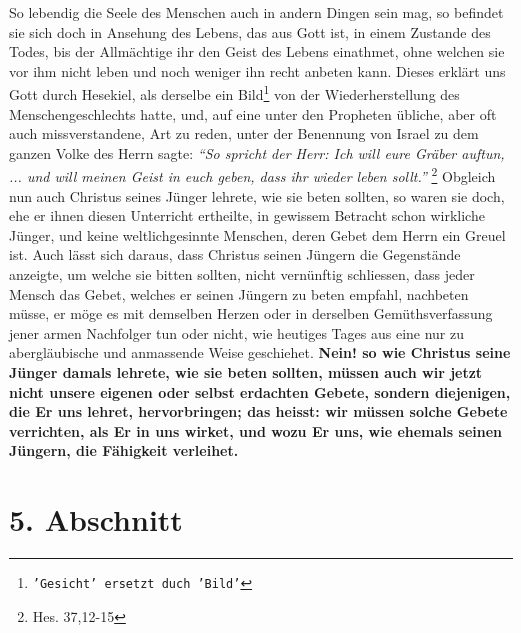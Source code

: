  So lebendig die Seele des Menschen auch in andern
Dingen sein mag, so befindet
sie sich doch in Ansehung des Lebens, das aus Gott ist, in einem Zustande des
Todes, bis der Allmächtige ihr den Geist des Lebens einathmet, ohne welchen sie
vor ihm nicht leben und noch weniger ihn recht anbeten kann. Dieses erklärt uns
Gott durch Hesekiel, als derselbe ein Bild\footnote{\texttt{'Gesicht' ersetzt duch
'Bild'}} von der Wiederherstellung des
Menschengeschlechts hatte, und,
auf eine unter den Propheten  übliche, aber oft auch
missverstandene, Art zu
reden, unter der Benennung von Israel  zu dem
ganzen Volke des Herrn sagte:
\textit{"`So spricht der Herr: Ich will eure Gräber auftun, ... und will meinen
Geist in
euch geben, dass ihr wieder leben sollt."'}
\footnote{Hes. 37,12-15}
Obgleich nun auch Christus seines
Jünger lehrete, wie sie beten sollten, so waren sie doch, ehe er ihnen diesen
Unterricht ertheilte, in gewissem Betracht schon wirkliche Jünger, und keine
weltlichgesinnte Menschen, deren Gebet dem Herrn ein Greuel ist. Auch
lässt sich daraus, dass Christus seinen Jüngern die Gegenstände anzeigte, um
welche sie bitten sollten, nicht
vernünftig schliessen, dass jeder Mensch das Gebet, welches er seinen Jüngern zu
beten empfahl, nachbeten  müsse, er möge es mit
demselben Herzen oder in
derselben Gemüthsverfassung jener armen Nachfolger tun oder nicht, wie heutiges
Tages aus eine nur zu abergläubische und anmassende Weise geschiehet.
\textbf{Nein! so
wie Christus seine Jünger damals lehrete, wie sie beten sollten, müssen auch wir
jetzt nicht unsere eigenen oder selbst erdachten Gebete, sondern diejenigen, die
Er uns
lehret, hervorbringen; das heisst: wir müssen solche Gebete verrichten, als Er
in uns wirket, und wozu Er uns, wie ehemals seinen Jüngern, die Fähigkeit
verleihet.}

\section{5. Abschnitt} \label{kap6_ab5}

